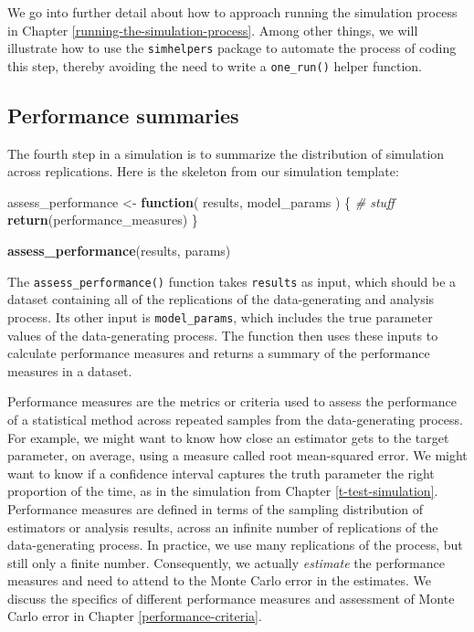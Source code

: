 \documentclass[
]{book}
\newenvironment{Shaded}{\begin{snugshade}}{\end{snugshade}}
\newcommand{\CommentTok}[1]{\textcolor[rgb]{0.56,0.35,0.01}{\textit{#1}}}
\newcommand{\ControlFlowTok}[1]{\textcolor[rgb]{0.13,0.29,0.53}{\textbf{#1}}}
\newcommand{\FunctionTok}[1]{\textcolor[rgb]{0.13,0.29,0.53}{\textbf{#1}}}
\newcommand{\NormalTok}[1]{#1}
\newcommand{\OtherTok}[1]{\textcolor[rgb]{0.56,0.35,0.01}{#1}}
\begin{document}
We go into further detail about how to approach running the simulation process in Chapter \ref{running-the-simulation-process}.
Among other things, we will illustrate how to use the \texttt{simhelpers} package to automate the process of coding this step, thereby avoiding the need to write a \texttt{one\_run()} helper function.

\subsection{Performance summaries}\label{performance-summaries}

The fourth step in a simulation is to summarize the distribution of simulation across replications.
Here is the skeleton from our simulation template:

\begin{Shaded}
\begin{Highlighting}[]
\NormalTok{assess\_performance }\OtherTok{\textless{}{-}} \ControlFlowTok{function}\NormalTok{( results, model\_params ) \{}
  \CommentTok{\# stuff}
  \FunctionTok{return}\NormalTok{(performance\_measures)}
\NormalTok{\}}

\FunctionTok{assess\_performance}\NormalTok{(results, params)}
\end{Highlighting}
\end{Shaded}

The \texttt{assess\_performance()} function takes \texttt{results} as input, which should be a dataset containing all of the replications of the data-generating and analysis process.
Its other input is \texttt{model\_params}, which includes the true parameter values of the data-generating process.
The function then uses these inputs to calculate performance measures and returns a summary of the performance measures in a dataset.

Performance measures are the metrics or criteria used to assess the performance of a statistical method across repeated samples from the data-generating process.
For example, we might want to know how close an estimator gets to the target parameter, on average, using a measure called root mean-squared error.
We might want to know if a confidence interval captures the truth parameter the right proportion of the time, as in the simulation from Chapter \ref{t-test-simulation}.
Performance measures are defined in terms of the sampling distribution of estimators or analysis results, across an infinite number of replications of the data-generating process.
In practice, we use many replications of the process, but still only a finite number. Consequently, we actually \emph{estimate} the performance measures and need to attend to the Monte Carlo error in the estimates.
We discuss the specifics of different performance measures and assessment of Monte Carlo error in Chapter \ref{performance-criteria}.
\end{document}
